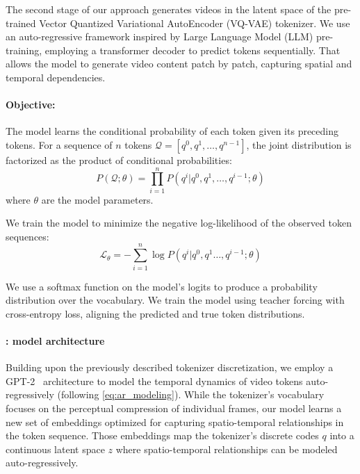 The second stage of our approach generates videos in the latent space of the pre-trained Vector Quantized Variational AutoEncoder (VQ-VAE) tokenizer. We use an auto-regressive framework inspired by Large Language Model (LLM) pre-training, employing a transformer decoder to predict tokens sequentially. That allows the model to generate video content patch by patch, capturing spatial and temporal dependencies.



\paragraph{Objective:} 
The model learns the conditional probability of each token given its preceding tokens. For a sequence of $n$ tokens $ \mathcal{Q} = [q^{0}, q^{1}, \dots, q^{n-1}]$, the joint distribution is factorized as the product of conditional probabilities:
\begin{equation}
    P(\mathcal{Q}; \theta) = \prod\limits_{i=1}^{n} P(q^{i}|q^{0}, q^{1}, \dots, q^{i-1}; \theta)
    \label{eq:ar_modeling}
\end{equation}
where $\theta$ are the model parameters. 

We train the model to minimize the negative log-likelihood of the observed token sequences:
\begin{equation}
    \mathcal{L}_{\theta} = -\sum_{i=1}^n \log P(q^{i}|q^{0}, q^{1} \dots, q^{i-1}; \theta)
    \label{eq:NLL}
\end{equation}

We use a softmax function on the model's logits to produce a probability distribution over the vocabulary. We train the model using teacher forcing with cross-entropy loss, aligning the predicted and true token distributions.

\paragraph{\vm{}: model architecture}  
Building upon the previously described tokenizer discretization, we employ a GPT-2~\cite{radford2019language} architecture to model the temporal dynamics of video tokens auto-regressively (following \autoref{eq:ar_modeling}).  While the tokenizer's vocabulary focuses on the perceptual compression of individual frames, our model learns a new set of embeddings optimized for capturing spatio-temporal relationships in the token sequence. Those embeddings map the tokenizer's discrete codes $q$ into a continuous latent space $z$ where spatio-temporal relationships can be modeled auto-regressively.

